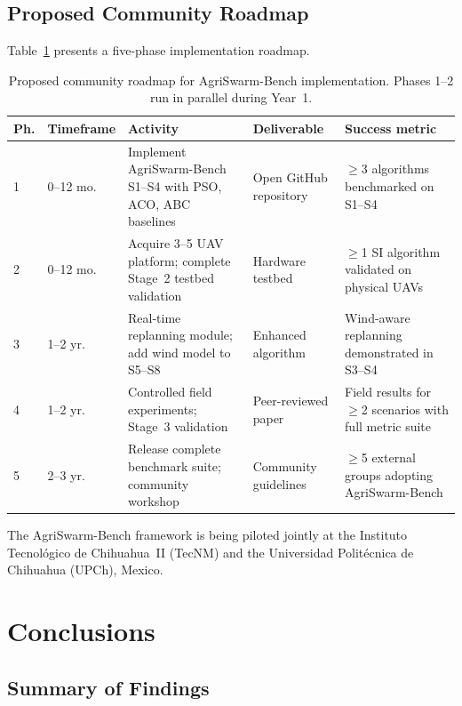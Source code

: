 \documentclass[review,3p]{elsarticle}
\begin{document}
\subsection{Proposed Community Roadmap}
\label{subsec:roadmap}

Table~\ref{tab:roadmap} presents a five-phase implementation roadmap.

\begin{table}[htbp]
\centering
\caption{Proposed community roadmap for AgriSwarm-Bench implementation.
Phases 1--2 run in parallel during Year~1.}
\label{tab:roadmap}
\begin{tabularx}{\textwidth}{llXlX}
\toprule
\textbf{Ph.} & \textbf{Timeframe} & \textbf{Activity} & \textbf{Deliverable} & \textbf{Success metric} \\
\midrule
1 & 0--12 mo. & Implement AgriSwarm-Bench S1--S4 with PSO, ACO, ABC baselines & Open GitHub repository & $\geq$3 algorithms benchmarked on S1--S4 \tabularnewline
2 & 0--12 mo. & Acquire 3--5 UAV platform; complete Stage~2 testbed validation  & Hardware testbed       & $\geq$1 SI algorithm validated on physical UAVs \tabularnewline
3 & 1--2 yr.  & Real-time replanning module; add wind model to S5--S8           & Enhanced algorithm     & Wind-aware replanning demonstrated in S3--S4 \tabularnewline
4 & 1--2 yr.  & Controlled field experiments; Stage~3 validation               & Peer-reviewed paper    & Field results for $\geq$2 scenarios with full metric suite \tabularnewline
5 & 2--3 yr.  & Release complete benchmark suite; community workshop            & Community guidelines   & $\geq$5 external groups adopting AgriSwarm-Bench \tabularnewline
\bottomrule
\end{tabularx}
\end{table}

The AgriSwarm-Bench framework is being piloted jointly at the Instituto
Tecnológico de Chihuahua~II (TecNM) and the Universidad Politécnica de
Chihuahua (UPCh), Mexico.


\section{Conclusions}

\subsection{Summary of Findings}
\label{subsec:summary_findings}
\end{document}
